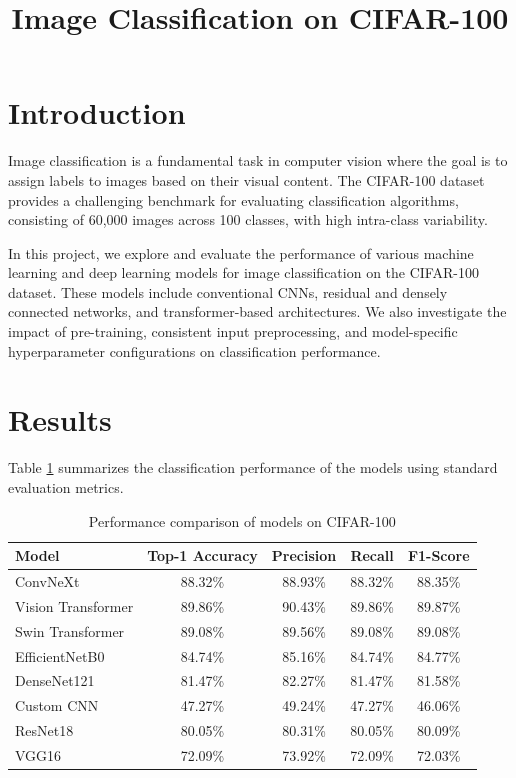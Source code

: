 \documentclass[11pt]{article}
\title{\textbf{Image Classification on CIFAR-100}}
\author{}
\date{}
\begin{document}
\maketitle

\section{Introduction}

Image classification is a fundamental task in computer vision where the goal is to assign labels to images based on their visual content. The CIFAR-100 dataset provides a challenging benchmark for evaluating classification algorithms, consisting of 60,000 images across 100 classes, with high intra-class variability.

In this project, we explore and evaluate the performance of various machine learning and deep learning models for image classification on the CIFAR-100 dataset. These models include conventional CNNs, residual and densely connected networks, and transformer-based architectures. We also investigate the impact of pre-training, consistent input preprocessing, and model-specific hyperparameter configurations on classification performance.

\section{Results}

Table \ref{tab:results} summarizes the classification performance of the models using standard evaluation metrics.

\begin{table}[H]
\centering
\caption{Performance comparison of models on CIFAR-100}
\label{tab:results}
\begin{tabular}{lcccc}
\toprule
\textbf{Model} & \textbf{Top-1 Accuracy} & \textbf{Precision} & \textbf{Recall} & \textbf{F1-Score} \\
\midrule
ConvNeXt            & 88.32\% & 88.93\% & 88.32\% & 88.35\% \\
Vision Transformer  & 89.86\% & 90.43\% & 89.86\% & 89.87\% \\
Swin Transformer    & 89.08\% & 89.56\% & 89.08\% & 89.08\% \\
EfficientNetB0      & 84.74\% & 85.16\% & 84.74\% & 84.77\% \\
DenseNet121         & 81.47\% & 82.27\% & 81.47\% & 81.58\% \\
Custom CNN          & 47.27\% & 49.24\% & 47.27\% & 46.06\% \\
ResNet18            & 80.05\% & 80.31\% & 80.05\% & 80.09\% \\
VGG16               & 72.09\% & 73.92\% & 72.09\% & 72.03\% \\
\bottomrule
\end{tabular}
\end{table}
\end{document}

